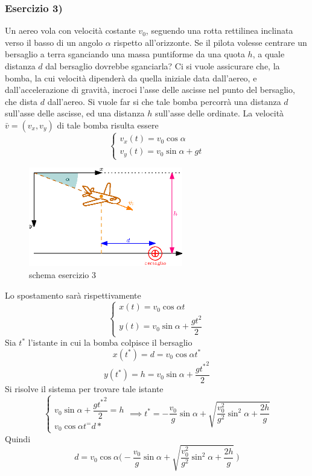 \documentclass[10pt, letterpaper]{report}
\begin{document}
\subsubsection{Esercizio 3)}
Un aereo vola con velocità costante $v_0$, seguendo una rotta rettilinea inclinata verso
 il basso di un angolo $\alpha$ rispetto all'orizzonte. Se il pilota volesse
  centrare un bersaglio a terra sganciando una massa puntiforme da una quota $h$,
   a quale distanza $d$ dal bersaglio dovrebbe sganciarla?\acc
Ci si vuole assicurare che, la bomba, la cui velocità dipenderà da quella iniziale data 
dall'aereo, e dall'accelerazione di gravità, incroci l'asse delle ascisse nel punto del bersaglio, che 
dista $d$ dall'aereo. Si vuole far si che tale bomba percorrà una distanza $d$ sull'asse delle ascisse, ed 
una distanza $h$ sull'asse delle ordinate. La velocità $\bar v=(v_x,v_y)$ di tale bomba risulta essere 
$$\begin{cases}
    v_x(t)=v_0\cos\alpha\\ 
    v_y(t)=v_0\sin\alpha+gt
\end{cases} $$
   \begin{figure}[h!]
    \centering
    \includegraphics[width=0.6\textwidth]{images/es3.eps}
    \caption{schema esercizio 3}
\end{figure}
Lo spostamento sarà rispettivamente 
$$ \begin{cases}
    x(t)=v_0\cos\alpha t\\ 
    y(t)= v_0\sin\alpha+\dfrac{gt^2}{2}
\end{cases}$$
Sia $t^*$ l'istante in cui la bomba colpisce il bersaglio 
$$ x(t^*)=d=v_0\cos\alpha t^*$$ 
$$ y(t^*)=h= v_0\sin\alpha+\frac{g{t^*}^2}{2}$$
Si risolve il sistema per trovare tale istante 
$$ \begin{cases}
    v_0\sin\alpha+\dfrac{g{t^*}^2}{2}=h\\ 
    v_0\cos\alpha t^=d*
\end{cases}\implies 
t^*=-\frac{v_0}{g}\sin\alpha+\sqrt{\frac{v_0^2}{g^2}\sin^2\alpha+\frac{2h}{g}}$$
Quindi 
$$ 
d=v_0\cos\alpha\Bigg(
    -\frac{v_0}{g}\sin\alpha+\sqrt{\frac{v_0^2}{g^2}\sin^2\alpha+\frac{2h}{g}}\     
\Bigg)
$$
\end{document}
